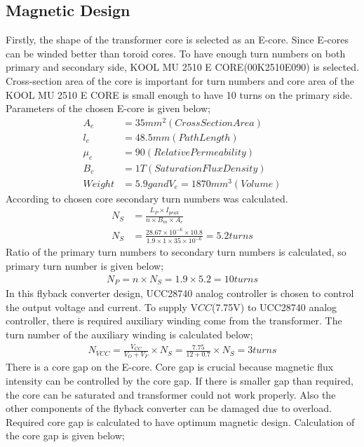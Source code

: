 \subsection{Magnetic Design}
Firstly, the shape of the transformer core is selected as an E-core. Since E-cores can be winded better than toroid cores. To have enough turn numbers on both primary and secondary side, KOOL MU 2510 E CORE(00K2510E090) is selected. Cross-section area of the core is important for turn numbers and core area of the KOOL MU 2510 E CORE is small enough to have 10 turns on the primary side. Parameters of the chosen E-core is given below;
\begin{align}
    A_e &= 35mm^2(Cross Section Area)\\ l_e &= 48.5 mm (Path Length) \\\mu_c &= 90 (Relative Permeability) \\ B_c &= 1 T (Saturation Flux Density) \\ Weight &= 5.9 g and V_e=1870 mm^3 (Volume) 
\end{align}
According to chosen core secondary turn numbers was calculated.
\begin{align}
    N_S&=\frac{L_P\times I_{peak}}{n\times B_m \times A_e}\\
    N_S&=\frac{28.67\times 10^{-6} \times 10.8 }{1.9 \times 1 \times 35 \times 10^{-6}}=5.2 turns
\end{align}
Ratio of the primary turn numbers to secondary turn numbers is calculated, so primary turn number is given below;
\begin{align}
    N_P= n\times N_S = 1.9 \times 5.2 = 10 turns
\end{align}
In this flyback converter design, UCC28740 analog controller is chosen to control the output voltage and current. To supply V$CC$(7.75V) to UCC28740 analog controller, there is required auxiliary winding come from the transformer. The turn number of the auxiliary winding is calculated below;
\begin{align}
    N_{VCC}= \frac{V_{CC}}{V_O+V_F}\times N_S = \frac{7.75}{12+0.7}\times N_S= 3 turns
\end{align}
There is a core gap on the E-core. Core gap is crucial because magnetic flux intensity can be controlled by the core gap. If there is smaller gap than required, the core can be saturated and transformer could not work properly. Also the other components of the flyback converter can be damaged due to overload. Required core gap is calculated to have optimum magnetic design. Calculation of the core gap is given below;

